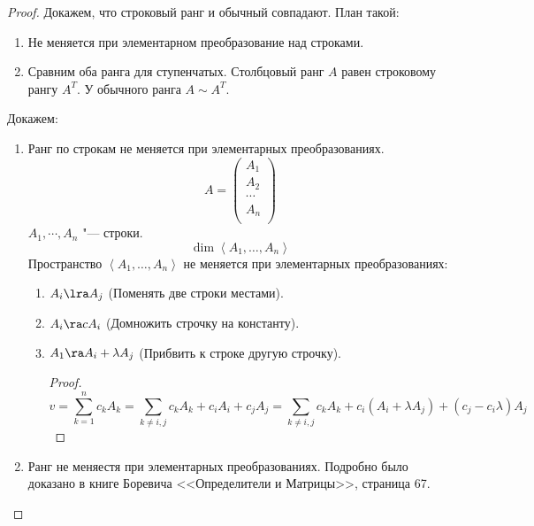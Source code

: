 \begin{proof}
	Докажем, что строковый ранг и обычный совпадают.
	План такой:
	\begin{enumerate}
	\item
		Не меняется при элементарном преобразование над строками.

	\item
		Сравним оба ранга для ступенчатых.
		Столбцовый ранг $A$ равен строковому рангу $A^T$.
		У обычного ранга $A \sim A^T$.
	\end{enumerate}
	Докажем:
	\begin{enumerate}
	\item
		Ранг по строкам не меняется при элементарных преобразованиях.
		\[
			A = \begin{pmatrix}
				A_1\\
				A_2\\
				\cdots\\
				A_n\\
			\end{pmatrix}
		\]
		$A_1,\cdots, A_n$ "--- строки.
		\[ \dim \left<A_1, \dots, A_n \right> \]
		Пространство $\left<A_1, \dots, A_n\right>$ не меняется при элементарных преобразованиях:
		\begin{enumerate}
		\item
			$A_i \lra A_j$ (Поменять две строки местами).

		\item
			$A_i \ra cA_i$ (Домножить строчку на константу).

		\item
			$A_1 \ra A_i + \lambda A_j$  (Прибвить к строке другую строчку).
			\begin{proof}
				\[ v = \sum_{k = 1}^n c_k A_k = \sum_{k \ne i, j}c_kA_k + c_iA_i + c_jA_j =
				\sum_{k \ne i, j}c_kA_k + c_i(A_i + \lambda A_j) + (c_j - c_i\lambda)A_j \]
			\end{proof}
		\end{enumerate}

	\item
		Ранг не меняестя при элементарных преобразованиях.
		Подробно было доказано в книге Боревича <<Определители и Матрицы>>, страница 67.


\end{enumerate}
\end{proof}
